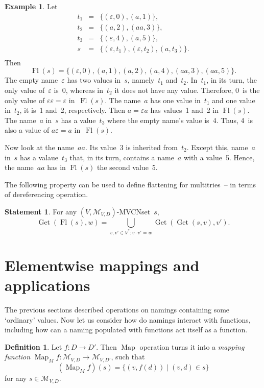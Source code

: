 \documentclass{article}
\theoremstyle{definition}
\newtheorem{Df}{Definition}
\newtheorem{St}{Statement}
\newtheorem{Ex}{Example}
\newcommand{\setcharmvcn}{M}
\newcommand{\setsymbol}[3]{\mathcal{#1}_{#2,#3}}
\newcommand{\setmvcn}[2]{\setsymbol{\setcharmvcn}{#1}{#2}}
\newcommand{\flatten}{\operatorname{Fl}}
\newcommand{\deref}{\operatorname{Get}}
\newcommand{\fmap}{\operatorname{Map}}
\begin{document}
\begin{Ex}\label{ex:flatten}
Let
\begin{eqnarray*}
  t_1 & = & \{ (\varepsilon, 0), (a, 1) \} ,\\
  t_2 & = & \{ (a, 2), (aa, 3) \} ,\\
  t_3 & = & \{ (\varepsilon, 4), (a, 5) \} ,\\
  s   & = & \{ (\varepsilon, t_1), (\varepsilon, t_2), (a, t_3) \} .\\
\end{eqnarray*}
Then
\[
  \flatten(s) = \{
      (\varepsilon, 0), (a, 1), (a, 2), (a, 4), (aa, 3), (aa, 5)
  \} .
\]
The empty name~$\varepsilon$ has two values in~$s$, namely~$t_1$ and~$t_2$.
In~$t_1$, in its turn, the only value of~$\varepsilon$ is~0, whereas in~$t_2$
it does not have any value. Therefore, 0~is the only value of $\varepsilon
\varepsilon = \varepsilon$ in~$\flatten(s)$.  The name~$a$ has one value in~$t_1$
and one value in~$t_2$, it is~1 and~2, respectively.  Then $a = \varepsilon a$
has values~1 and~2 in $\flatten(s)$.  The name~$a$ in~$s$ has a value~$t_3$
where the empty name's value is~4. Thus, 4~is also a value of $a \varepsilon =
a$ in~$\flatten(s)$.

Now look at the name~$aa$. Its value~3 is inherited from~$t_2$. Except this,
name~$a$ in~$s$ has a valaue~$t_3$ that, in its turn, contains a name~$a$ with
a value~5. Hence, the name~$aa$ has in $\flatten(s)$ the second value~5.
\end{Ex}

The following property can be used to define flattening for multitries~--
in terms of dereferencing operation.
\begin{St}\label{st:deref-flatten}
For any $(V,\setmvcn{V}{D})$-MVCNset~$s$,
\[
  \deref(\flatten(s), w) =
      \bigcup_{v,v'\in V^\ast: v\cdot v' = w}
        \deref(\deref(s, v), v') .
\]
\end{St}



\section{Elementwise mappings and applications}

The previous sections described operations on namings containing some
`ordinary' values. Now let us consider how do namings interact with
functions, including how can a naming populated with functions act itself
as a function.

\begin{Df}\label{df:mvcn-map}
Let $f : D \to D'$. Then $\fmap$ operation turns it into a \emph{mapping
function} $\fmap_{\setcharmvcn} f : \setmvcn{V}{D} \to \setmvcn{V}{D'}$, such
that
\[
  (\fmap_{\setcharmvcn} f)(s) = \{ (v, f(d)) \mid (v, d) \in s \}
\]
for any $s \in \setmvcn{V}{D}$.
\end{Df}
\end{document}
